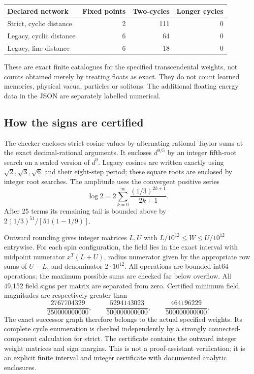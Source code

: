 \documentclass[11pt,a4paper]{article}
\begin{document}
\begin{center}
\begin{tabular}{lrrr}
\toprule Declared network & Fixed points & Two-cycles & Longer cycles\\\midrule
Strict, cyclic distance & 2 & 111 & 0\\
Legacy, cyclic distance & 6 & 64 & 0\\
Legacy, line distance & 6 & 18 & 0\\\bottomrule
\end{tabular}
\end{center}
These are exact finite catalogues for the specified transcendental weights,
not counts obtained merely by treating floats as exact. They do not count
learned memories, physical vacua, particles or solitons. The additional
floating energy data in the JSON are separately labelled numerical.

\subsection{How the signs are certified}

The checker encloses strict cosine values by alternating rational Taylor
sums at the exact decimal-rational arguments. It encloses $d^{9/5}$ by an
integer fifth-root search on a scaled version of $d^9$. Legacy cosines are
written exactly using $\sqrt2,\sqrt3,\sqrt6$ and their eight-step period;
these square roots are enclosed by integer root searches. The amplitude
uses the convergent positive series
\[
 \log2=2\sum_{k=0}^{\infty}\frac{(1/3)^{2k+1}}{2k+1}.
\]
After 25 terms its remaining tail is bounded above by
$2(1/3)^{51}/[51(1-1/9)]$.

Outward rounding gives integer matrices $L,U$ with
$L/10^{12}\le W\le U/10^{12}$ entrywise. For each spin configuration,
the field lies in the exact interval with midpoint numerator
$x^T(L+U)$, radius numerator given by the appropriate row sums of $U-L$,
and denominator $2\cdot10^{12}$. All operations are bounded int64
operations; the maximum possible sums are checked far below overflow.
All 49,152 field signs per matrix are separated from zero. Certified
minimum field magnitudes are respectively greater than
\[
 \frac{2767704329}{250000000000},\qquad
 \frac{5294143023}{500000000000},\qquad
 \frac{464196229}{500000000000}.
\]
The exact successor graph therefore belongs to the actual specified
weights. Its complete cycle enumeration is checked independently by a
strongly connected-component calculation for strict. The certificate
contains the outward integer weight matrices and sign margins. This is
not a proof-assistant verification; it is an explicit finite interval and
integer certificate with documented analytic enclosures.
\end{document}
